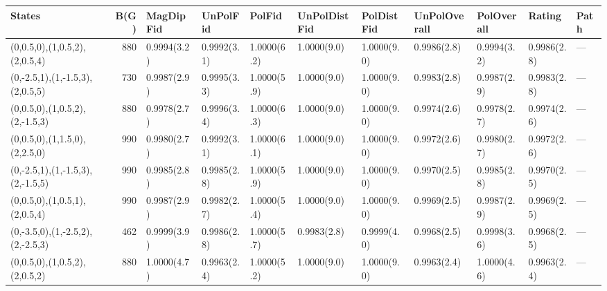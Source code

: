 \begin{tabular}{lrlllllllll}
\hline
 States                           &   B(G) & MagDipFid   & UnPolFid    & PolFid      & UnPolDistFid   & PolDistFid   & UnPolOverall   & PolOverall   & Rating      & Path   \\
\hline
 (0,0.5,0),(1,0.5,2),(2,0.5,4)    &    880 & 0.9994(3.2) & 0.9992(3.1) & 1.0000(6.2) & 1.0000(9.0)    & 1.0000(9.0)  & 0.9986(2.8)    & 0.9994(3.2)  & 0.9986(2.8) & ---    \\
 (0,-2.5,1),(1,-1.5,3),(2,0.5,5)  &    730 & 0.9987(2.9) & 0.9995(3.3) & 1.0000(5.9) & 1.0000(9.0)    & 1.0000(9.0)  & 0.9983(2.8)    & 0.9987(2.9)  & 0.9983(2.8) & ---    \\
 (0,0.5,0),(1,0.5,2),(2,-1.5,3)   &    880 & 0.9978(2.7) & 0.9996(3.4) & 1.0000(6.3) & 1.0000(9.0)    & 1.0000(9.0)  & 0.9974(2.6)    & 0.9978(2.7)  & 0.9974(2.6) & ---    \\
 (0,0.5,0),(1,1.5,0),(2,2.5,0)    &    990 & 0.9980(2.7) & 0.9992(3.1) & 1.0000(6.1) & 1.0000(9.0)    & 1.0000(9.0)  & 0.9972(2.6)    & 0.9980(2.7)  & 0.9972(2.6) & ---    \\
 (0,-2.5,1),(1,-1.5,3),(2,-1.5,5) &    990 & 0.9985(2.8) & 0.9985(2.8) & 1.0000(5.9) & 1.0000(9.0)    & 1.0000(9.0)  & 0.9970(2.5)    & 0.9985(2.8)  & 0.9970(2.5) & ---    \\
 (0,0.5,0),(1,0.5,1),(2,0.5,4)    &    990 & 0.9987(2.9) & 0.9982(2.7) & 1.0000(5.4) & 1.0000(9.0)    & 1.0000(9.0)  & 0.9969(2.5)    & 0.9987(2.9)  & 0.9969(2.5) & ---    \\
 (0,-3.5,0),(1,-2.5,2),(2,-2.5,3) &    462 & 0.9999(3.9) & 0.9986(2.8) & 1.0000(5.7) & 0.9983(2.8)    & 0.9999(4.0)  & 0.9968(2.5)    & 0.9998(3.6)  & 0.9968(2.5) & ---    \\
 (0,0.5,0),(1,0.5,2),(2,0.5,2)    &    880 & 1.0000(4.7) & 0.9963(2.4) & 1.0000(5.2) & 1.0000(9.0)    & 1.0000(9.0)  & 0.9963(2.4)    & 1.0000(4.6)  & 0.9963(2.4) & ---    \\
\hline
\end{tabular}